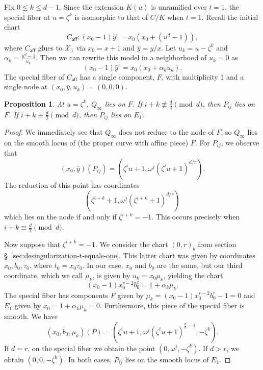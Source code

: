 \documentclass[reqno]{amsart}
\newtheorem{proposition}[thm]{Proposition}
\theoremstyle{definition}
\theoremstyle{remark}
\def\XX{\mathcal{X}}
\def\caff{C_{\textsf{aff}}}
\begin{document}
Fix $0 \leq k \leq d-1$. Since the extension $K(u)$ is unramified over $t = 1$, the special fiber at $u = \zeta^k$ is isomorphic to that of $C/K$ when $t = 1$. Recall the initial chart 
\[
\caff: (x_0 - 1) \bar{y}^r = x_0(x_0 + (u^d - 1)),
\]
where $\caff$ glues to $\XX_1$ via $x_0 = x + 1$ and $\bar{y} = y/x$. Let $u_k = u - \zeta^k$ and $\alpha_k = \frac{u^d - 1}{u_k}$. Then we can rewrite this model in a neighborhood of $u_k = 0$ as
\[
(x_0 - 1) \bar{y}^r = x_0(x_0 + \alpha_ku_k).
\]
The special fiber of $\caff$ has a single component, $F$, with multiplicity 1 and a single node at $(x_0, \bar{y}, u_k) = (0,0,0)$.
\begin{proposition}\label{prop:points-on-components-u-zeta-k}
  At $u=\zeta^k$, $Q_\infty$ lies on $F$. If $i+k \not\equiv \frac{d}{2} \pmod{d}$, then $P_{ij}$ lies on $F$. If $i + k \equiv \frac{d}{2} \pmod{d}$, then $P_{ij}$ lies on $E_1$.
\end{proposition}

\begin{proof}
  We immediately see that $Q_\infty$ does not reduce to the node of $F$, so $Q_\infty$ lies on the smooth locus of (the proper curve with affine piece) $F$. For $P_{ij}$, we observe that
  \[
  (x_0, \bar{y})(P_{ij}) = (\zeta^i u + 1, \omega^j (\zeta^i u + 1)^{d/r}).
  \]
  The reduction of this point has coordinates
  \begin{equation}
    (\zeta^{i+k} + 1, \omega^j(\zeta^{i+k} + 1)^{d/r})\label{eq:pij-on-u-equals-zeta-k}
  \end{equation}
    which lies on the node if and only if $\zeta^{i+k} = -1$. This occurs precisely when $i + k \equiv \frac{d}{2} \pmod{d}$.

  Now suppose that $\zeta^{i+k} = -1$. We consider the chart $(0,r)_b$ from section \S~\ref{sec:desingularization-t-equals-one}. This latter chart was given by coordinates $x_0, b_0, \tau_0$, where $t_0 = x_0 \tau_0$. In our case, $x_0$ and $b_0$ are the same, but our third coordinate, which we call $\mu_k$, is given by $u_k = x_0 \mu_k$, yielding the chart
  \[
  (x_0 - 1)x_0^{r-2}b_0^r = 1 + \alpha_k \mu_k.
  \]
  The special fiber has components $F$ given by $\mu_k = (x_0 - 1)x_0^{r-2}b_0^r - 1 = 0$ and $E_1$ given by $x_0 = 1 + \alpha_k \mu_k = 0$. Furthermore, this piece of the special fiber is smooth. We have
  \[
  (x_0, b_0, \mu_k)(P) = (\zeta^iu + 1, \omega^j(\zeta^i u + 1)^{\frac{d}{r} - 1}, -\zeta^k).
  \]
  If $d = r$, on the special fiber we obtain the point $(0, \omega^j, -\zeta^k)$. If $d > r$, we obtain $(0, 0, -\zeta^k)$. In both cases, $P_{ij}$ lies on the smooth locus of $E_1$.
\end{proof}
\end{document}
